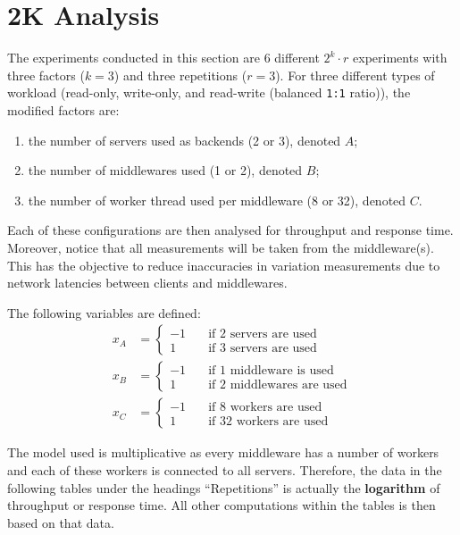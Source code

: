 \documentclass[11pt,a4paper]{article}
\begin{document}
\section{2K Analysis}
The experiments conducted in this section are 6 different $2^k\cdot r$ experiments with three factors ($k = 3$) and three repetitions ($r = 3$). For three different types of workload (read-only, write-only, and read-write (balanced \texttt{1:1} ratio)), the modified factors are:
\begin{enumerate}
    \item the number of servers used as backends (2 or 3), denoted $A$;
    \item the number of middlewares used (1 or 2), denoted $B$;
    \item the number of worker thread used per middleware (8 or 32), denoted $C$.
\end{enumerate}
Each of these configurations are then analysed for throughput and response time. Moreover, notice that all measurements will be taken from the middleware(s). This has the objective to reduce inaccuracies in variation measurements due to network latencies between clients and middlewares.

The following variables are defined:
\begin{align}
    x_A &=
    \begin{cases}
        -1 \quad &\text{if 2 servers are used}\\
        1 \quad &\text{if 3 servers are used}
    \end{cases}\label{eq::x_a}\\
    x_B &=
    \begin{cases}
        -1 \quad &\text{if 1 middleware is used}\\
        1 \quad &\text{if 2 middlewares are used}
    \end{cases}\label{eq::x_b}\\
    x_C &=
    \begin{cases}
        -1 \quad &\text{if 8 workers are used}\\
        1 \quad &\text{if 32 workers are used}
    \end{cases}\label{eq::x_c}
\end{align}

The model used is multiplicative as every middleware has a number of workers and each of these workers is connected to all servers. Therefore, the data in the following tables under the headings ``Repetitions'' is actually the \textbf{logarithm} of throughput or response time. All other computations within the tables is then based on that data.
\end{document}
